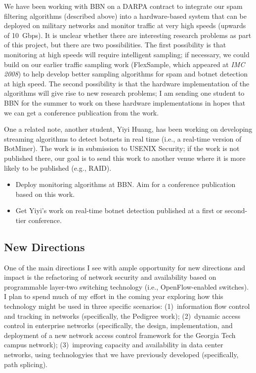 \begin{sloppypar}
We have been working with BBN on a DARPA contract to integrate our spam
filtering algorithms (described above) into a hardware-based system that
can be deployed on military networks and monitor traffic at very
high speeds (upwards of 10~Gbps).  It is unclear whether there are
interesting research problems as part of this project, but there are two
possibilities.  The first possibility is that monitoring at high speeds
will require intelligent sampling; if necessary, we could build on our
earlier traffic sampling work (FlexSample, which appeared at {\em IMC
2008}) to help develop better sampling algorithms for spam and botnet
detection at high speed.  The second possibility is that the hardware
implementation of the algorithms will give rise to new research
problems; I am sending one student to BBN for the summer to work on these
hardware implementations in hopes that we can get a conference
publication from the work.

One a related note, another student, Yiyi Huang, has been working on
developing streaming algorithms to detect botnets in real time (i.e., a
real-time version of BotMiner).  The work is in submission to USENIX
Security; if the work is not published there, our goal is to send this
work to another venue where it is more likely to be published (e.g.,
RAID).

\begin{itemize}
\itemsep=-1pt
\item Deploy monitoring algorithms at BBN.  Aim for
a conference publication based on this work.
\item Get Yiyi's work on real-time botnet detection published at a first
or second-tier conference.
\end{itemize}


\subsection*{New Directions}


One of the main directions I see with ample opportunity for new
directions and impact is the refactoring of network security and
availability based on programmable layer-two switching technology (i.e.,
OpenFlow-enabled switches).  I plan to spend much of my effort in the
coming year exploring how this technology might be used in three
specific scenarios: (1)~information flow control and tracking in
networks (specifically, the Pedigree work); (2)~dynamic access control
in enterprise networks (specifically, the design, implementation, and
deployment of a new network access control framework for the Georgia
Tech campus network); (3)~improving capacity and availability in data
center networks, using technologyies that we have previously developed
(specifically, path splicing).


\end{sloppypar}
